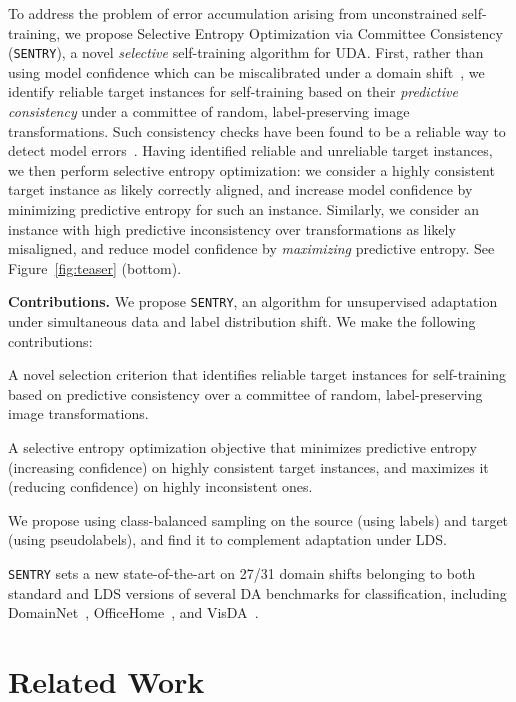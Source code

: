 \documentclass[10pt,twocolumn,letterpaper]{article}
\newcommand{\method}{\texttt{SENTRY}\xspace}
\begin{document}
To address the problem of error accumulation arising from unconstrained self-training, we propose Selective Entropy Optimization via Committee Consistency (\method), a novel \emph{selective} self-training algorithm for UDA. First, rather than using model confidence which can be miscalibrated under a domain shift~\cite{snoek2019can}, we identify reliable target instances for self-training based on their \emph{predictive consistency} under a committee of random, label-preserving image transformations. Such consistency checks have been found to be a reliable way to detect model errors~\cite{bahat2019natural}. Having identified reliable and unreliable target instances, we then perform selective entropy optimization: we consider a highly consistent target instance as likely correctly aligned, and increase model confidence by minimizing predictive entropy for such an instance. Similarly, we consider an instance with high predictive inconsistency over transformations as likely misaligned, and reduce model confidence by \emph{maximizing} predictive entropy. See Figure~\ref{fig:teaser} (bottom).
   

\noindent \textbf{Contributions.} We propose \method, an algorithm for unsupervised adaptation under simultaneous data and label distribution shift. We make the following contributions:
\begin{compactenum}
   \item A novel selection criterion that identifies reliable target instances for self-training based on predictive consistency over a committee of random, label-preserving image transformations.
   \item A selective entropy optimization objective that minimizes predictive entropy (increasing confidence) on highly consistent target instances, and maximizes it (reducing confidence) on highly inconsistent ones.
   \item We propose using class-balanced sampling on the source (using labels) and target (using pseudolabels), and find it to complement adaptation under LDS.
   \item \method sets a new state-of-the-art on 27/31 domain shifts belonging to both standard and LDS versions of several DA benchmarks for classification, including DomainNet~\cite{peng2019moment}, OfficeHome~\cite{venkateswara2017deep}, and VisDA~\cite{peng2017visda}.
\end{compactenum}

 \vspace{-5pt}
\section{Related Work}
\label{ref:relwork}
\vspace{-4pt}
\end{document}
